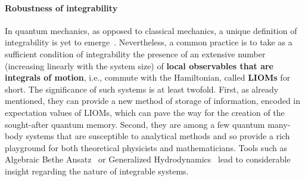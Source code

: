 \paragraph{Robustness of integrability}
In quantum mechanics, as opposed to classical mechanics, a unique definition of integrability
is yet to emerge~\autocite{Caux2011, Yuzbashyan2013}. Nevertheless, a common practice is to take as a sufficient condition of
integrability the presence of an extensive number (increasing linearly with the system size) of \textbf{local observables
that are integrals of motion}, i.e., commute with the Hamiltonian, called \textbf{LIOMs} for short. The significance of such
systems is at least twofold.
First, as already mentioned, they can provide a new method of storage of information, encoded in expectation values
of LIOMs, which can pave the way for the creation of the sought-after quantum memory.
Second, they are among a few quantum many-body systems that are susceptible to analytical methods and so provide
a rich playground for both theoretical physicists and mathematicians. Tools such as Algebraic Bethe
Ansatz~\autocite{Faddeev1995,Faddeev1996,Korepin1993} or Generalized Hydrodynamics~\autocite{Agrawal2020,Friedman2020,
    Bertini2021, Bastianello2021, Bulchandani2021} lead to considerable insight regarding the nature of integrable systems.

